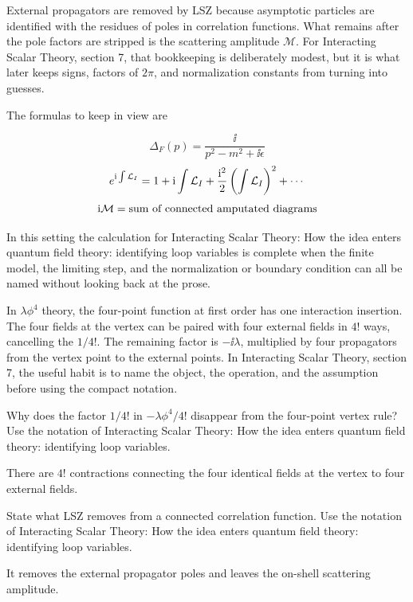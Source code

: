 External propagators are removed by LSZ because asymptotic particles are identified with the residues of poles in correlation functions.  What remains after the pole factors are stripped is the scattering amplitude \(\mathcal M\).  For Interacting Scalar Theory, section 7, that bookkeeping is deliberately modest, but it is what later keeps signs, factors of \(2\pi\), and normalization constants from turning into guesses.

The formulas to keep in view are

\[
  \Delta_F(p)=\frac{\ii}{p^2-m^2+\ii\epsilon}
\]
\[
  e^{\mathrm i\int\mathcal L_I}=1+\mathrm i\int\mathcal L_I+\frac{\mathrm i^2}{2}\left(\int\mathcal L_I\right)^2+\cdots
\]
\[
  \mathrm i\mathcal M=\hbox{sum of connected amputated diagrams}
\]

In this setting the calculation for Interacting Scalar Theory: How the idea enters quantum field theory: identifying loop variables is complete when the finite model, the limiting step, and the normalization or boundary condition can all be named without looking back at the prose.




\begin{example}
In \(\lambda\phi^4\) theory, the four-point function at first order has one interaction insertion.  The four fields at the vertex can be paired with four external fields in \(4!\) ways, cancelling the \(1/4!\).  The remaining factor is \(-\ii\lambda\), multiplied by four propagators from the vertex point to the external points.  In Interacting Scalar Theory, section 7, the useful habit is to name the object, the operation, and the assumption before using the compact notation.
\end{example}



\begin{exercise}
Why does the factor \(1/4!\) in \(-\lambda\phi^4/4!\) disappear from the four-point vertex rule?  Use the notation of Interacting Scalar Theory: How the idea enters quantum field theory: identifying loop variables.
\begin{answer}
There are \(4!\) contractions connecting the four identical fields at the vertex to four external fields.
\end{answer}
\end{exercise}

\begin{exercise}
State what LSZ removes from a connected correlation function.  Use the notation of Interacting Scalar Theory: How the idea enters quantum field theory: identifying loop variables.
\begin{answer}
It removes the external propagator poles and leaves the on-shell scattering amplitude.
\end{answer}
\end{exercise}



